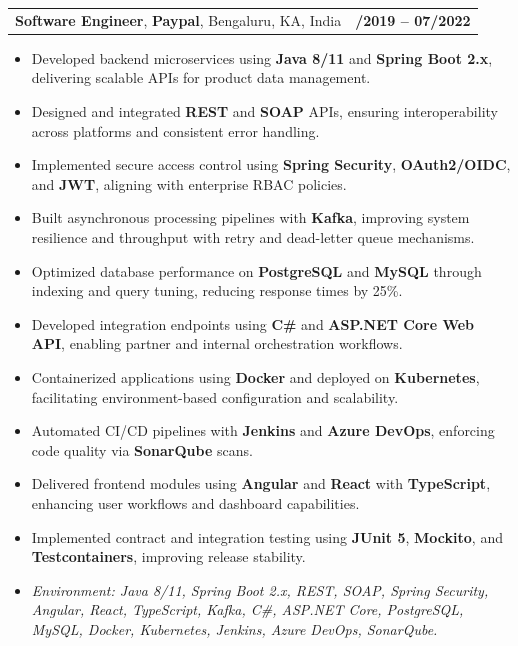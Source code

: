 \documentclass[letterpaper,11pt]{article}
\makeatletter
\newcommand{\resumeItem}[1]{
  \item\footnotesize{
    {#1 \vspace{-2pt}}
  }
}
\newcommand{\resumeSubheading}[4]{
  \vspace{-2pt}\item
    \begin{tabular*}{1.0\textwidth}[t]{l@{\extracolsep{\fill}}r}
      \textbf{\fontsize{10pt}{14pt}\selectfont #3}, \textbf{\fontsize{10pt}{14pt}\selectfont #1}, \fontsize{10pt}{14pt}\selectfont #4 & \textbf{\fontsize{10pt}{14pt}\selectfont #2} \\
    \end{tabular*}\vspace{-7pt}
}
\newcommand{\resumeItemListStart}{\begin{itemize}[leftmargin=*]}
\newcommand{\resumeItemListEnd}{\end{itemize}\vspace{-5pt}}
\makeatother
\begin{document}
\resumeSubheading
{Paypal}{08/2019 -- 07/2022}
{Software Engineer}{Bengaluru, KA, India}
\resumeItemListStart
  \resumeItem{Developed backend microservices using \textbf{Java 8/11} and \textbf{Spring Boot 2.x}, delivering scalable APIs for product data management.}
  \resumeItem{Designed and integrated \textbf{REST} and \textbf{SOAP} APIs, ensuring interoperability across platforms and consistent error handling.}
  \resumeItem{Implemented secure access control using \textbf{Spring Security}, \textbf{OAuth2/OIDC}, and \textbf{JWT}, aligning with enterprise RBAC policies.}
  \resumeItem{Built asynchronous processing pipelines with \textbf{Kafka}, improving system resilience and throughput with retry and dead-letter queue mechanisms.}
  \resumeItem{Optimized database performance on \textbf{PostgreSQL} and \textbf{MySQL} through indexing and query tuning, reducing response times by 25\%.}
  \resumeItem{Developed integration endpoints using \textbf{C\#} and \textbf{ASP.NET Core Web API}, enabling partner and internal orchestration workflows.}
  \resumeItem{Containerized applications using \textbf{Docker} and deployed on \textbf{Kubernetes}, facilitating environment-based configuration and scalability.}
  \resumeItem{Automated CI/CD pipelines with \textbf{Jenkins} and \textbf{Azure DevOps}, enforcing code quality via \textbf{SonarQube} scans.}
  \resumeItem{Delivered frontend modules using \textbf{Angular} and \textbf{React} with \textbf{TypeScript}, enhancing user workflows and dashboard capabilities.}
  \resumeItem{Implemented contract and integration testing using \textbf{JUnit 5}, \textbf{Mockito}, and \textbf{Testcontainers}, improving release stability.}
  \resumeItem{\textit{Environment: Java 8/11, Spring Boot 2.x, REST, SOAP, Spring Security, Angular, React, TypeScript, Kafka, C\#, ASP.NET Core, PostgreSQL, MySQL, Docker, Kubernetes, Jenkins, Azure DevOps, SonarQube.}}
\resumeItemListEnd
\end{document}
